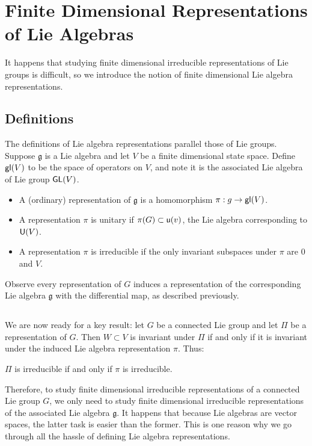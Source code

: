 \section{Finite Dimensional Representations of Lie Algebras}
It happens that studying finite dimensional irreducible representations of Lie groups is difficult, so we introduce the notion of finite dimensional Lie algebra representations.

\subsection{Definitions}
The definitions of Lie algebra representations parallel those of Lie groups. Suppose $\mathfrak g$ is a Lie algebra and let $V$ be a finite dimensional state space. Define $\operatorname{\textsf{gl}}(V)$ to be the space of operators on $V$, and note it is the associated Lie algebra of Lie group $\operatorname{\textsf{GL}}(V)$.
\begin{itemize}
    \item A (ordinary) representation of $\mathfrak g$ is a homomorphism $\mathfrak \pi: g \rightarrow \operatorname{\textsf{gl}}(V)$.
    \item A representation $\pi$ is unitary if $\pi(G) \subset \operatorname{\textsf{u}}(v)$, the Lie algebra corresponding to $\operatorname{\textsf{U}}(V)$.
    \item A representation $\pi$ is irreducible if the only invariant subspaces under $\pi$ are $0$ and $V$.
\end{itemize}
Observe every representation of $G$ induces a representation of the corresponding Lie algebra $\mathfrak g$ with the differential map, as described previously.

\subsection{}
We are now ready for a key result: let $G$ be a connected Lie group and let $\Pi$ be a representation of $G$. Then $W \subset V$ is invariant under $\Pi$ if and only if it is invariant under the induced Lie algebra representation $\pi$. Thus:
\begin{center}
    $\Pi$ is irreducible if and only if $\pi$ is irreducible.
\end{center}

Therefore, to study finite dimensional irreducible representations of a connected Lie group $G$, we only need to study finite dimensional irreducible representations of the associated Lie algebra $\mathfrak g$. It happens that because Lie algebras are vector spaces, the latter task is easier than the former. This is one reason why we go through all the hassle of defining Lie algebra representations.

